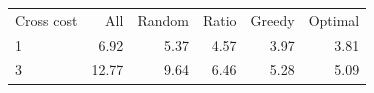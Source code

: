 \begin{tabular}{lrrrrr}
Cross cost & All & Random & Ratio & Greedy & Optimal \\
1 & 6.92 & 5.37 & 4.57 & 3.97 & 3.81 \\
3 & 12.77 & 9.64 & 6.46 & 5.28 & 5.09 \\
\end{tabular}
